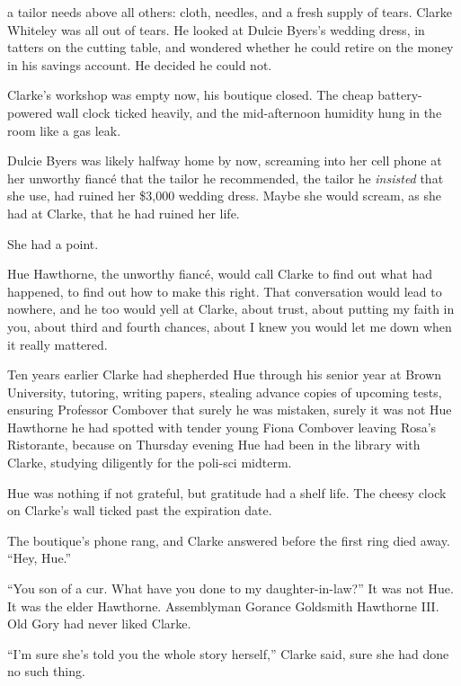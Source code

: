 \def\previewtitle{Tailor’s Tears}
\def\previewauthor{Dale Hartley Emery}

\previewannouncementpage

\previewpage

 a tailor needs above all others: cloth, needles,
and a fresh supply of tears. Clarke Whiteley was all out of tears. He
looked at Dulcie Byers’s wedding dress, in tatters on the cutting table,
and wondered whether he could retire on the money in his savings
account. He decided he could not.

Clarke’s workshop was empty now, his boutique closed. The cheap
battery-powered wall clock ticked heavily, and the mid-afternoon
humidity hung in the room like a gas leak.

Dulcie Byers was likely halfway home by now, screaming into her cell
phone at her unworthy fiancé that the tailor he recommended, the tailor
he \emph{insisted} that she use, had ruined her \$3,000 wedding dress.
Maybe she would scream, as she had at Clarke, that he had ruined her
life.

She had a point.

Hue Hawthorne, the unworthy fiancé, would call Clarke to find out what
had happened, to find out how to make this right. That conversation
would lead to nowhere, and he too would yell at Clarke, about trust,
about putting my faith in you, about third and fourth chances, about I
knew you would let me down when it really mattered.

Ten years earlier Clarke had shepherded Hue through his senior year at
Brown University, tutoring, writing papers, stealing advance copies of
upcoming tests, ensuring Professor Combover that surely he was mistaken,
surely it was not Hue Hawthorne he had spotted with tender young Fiona
Combover leaving Rosa’s Ristorante, because on Thursday evening Hue had
been in the library with Clarke, studying diligently for the poli-sci
midterm.

Hue was nothing if not grateful, but gratitude had a shelf life. The
cheesy clock on Clarke’s wall ticked past the expiration date.

The boutique’s phone rang, and Clarke answered before the first ring
died away. “Hey, Hue.”

“You son of a cur. What have you done to my daughter-in-law?” It was not
Hue. It was the elder Hawthorne. Assemblyman Gorance Goldsmith Hawthorne
III. Old Gory had never liked Clarke.

“I’m sure she’s told you the whole story herself,” Clarke said, sure she
had done no such thing.

